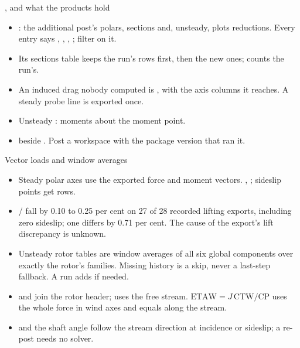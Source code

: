 \begin{frame}{, and what the products hold}
\begin{itemize}\small
  \item {}: the additional post's polars,
        sections and, unsteady, plots reductions. Every 
        entry says , ,
        , ; filter on it.
  \item Its sections table keeps the run's rows first, then the new ones;
         counts the run's.
  \item An induced drag nobody computed is , with the axis columns it
        reaches. A steady probe line is exported once.
  \item Unsteady : moments about the
        moment point.
  \item {} beside . Post a workspace with
        the package version that ran it.
\end{itemize}
\end{frame}

\begin{frame}{Vector loads and window averages}
\begin{itemize}\small
\item Steady polar axes use the exported force and moment vectors.
, ; sideslip points get rows.
\item {}/ fall by 0.10 to 0.25 per cent on 27 of 28 recorded
lifting exports, including zero sideslip; one differs by 0.71 per cent.
The cause of the export's lift discrepancy is unknown.
\item Unsteady rotor tables are window averages of all six global
 components over exactly the rotor's families. Missing history is a
skip, never a last-step fallback. A run adds  if needed.
\item {} and  join the rotor header;
 uses the free stream. $\mathrm{ETAW}=J\,\mathrm{CTW}/\mathrm{CP}$
uses the whole force in wind axes and equals  along the stream.
\item {} and the shaft angle follow the stream direction at
incidence or sideslip; a re-post needs no solver.
\end{itemize}
\end{frame}

